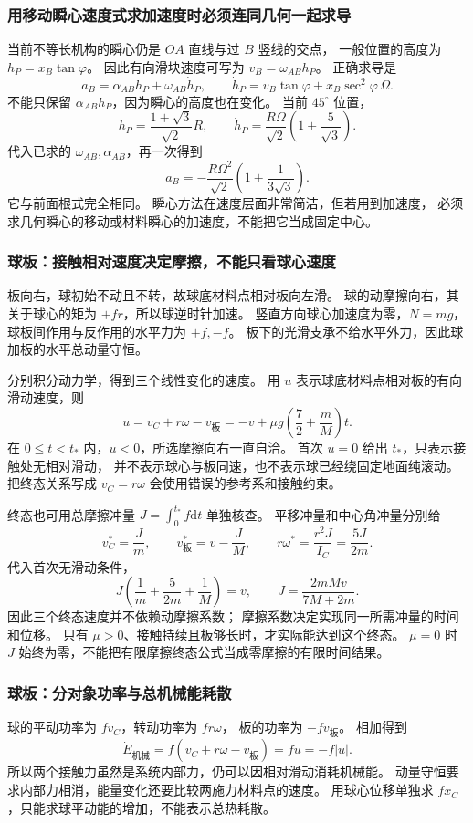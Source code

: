 \documentclass[UTF8,zihao=-4,fontset=fandol,a4paper]{ctexart}
\newcommand{\dd}{\mathrm d}
\begin{document}
\subsubsection*{用移动瞬心速度式求加速度时必须连同几何一起求导}
当前不等长机构的瞬心仍是 $OA$ 直线与过 $B$ 竖线的交点，
一般位置的高度为 $h_P=x_B\tan\varphi$。
因此有向滑块速度可写为 $v_B=\omega_{AB}h_P$。
正确求导是
\[
a_B=\alpha_{AB}h_P+\omega_{AB}\dot h_P,
\qquad
\dot h_P=v_B\tan\varphi+x_B\sec^2\varphi\,\Omega.
\]
不能只保留 $\alpha_{AB}h_P$，因为瞬心的高度也在变化。
当前 $45^\circ$ 位置，
\[
h_P=\frac{1+\sqrt3}{\sqrt2}R,
\qquad
\dot h_P=\frac{R\Omega}{\sqrt2}\left(1+\frac5{\sqrt3}\right).
\]
代入已求的 $\omega_{AB},\alpha_{AB}$，再一次得到
\[
a_B=-\frac{R\Omega^2}{\sqrt2}\left(1+\frac1{3\sqrt3}\right).
\]
它与前面根式完全相同。
瞬心方法在速度层面非常简洁，但若用到加速度，
必须求几何瞬心的移动或材料瞬心的加速度，不能把它当成固定中心。

\subsubsection*{球板：接触相对速度决定摩擦，不能只看球心速度}
板向右，球初始不动且不转，故球底材料点相对板向左滑。
球的动摩擦向右，其关于球心的矩为 $+fr$，所以球逆时针加速。
竖直方向球心加速度为零，$N=mg$，球板间作用与反作用的水平力为 $+f,-f$。
板下的光滑支承不给水平外力，因此球加板的水平总动量守恒。

分别积分动力学，得到三个线性变化的速度。
用 $u$ 表示球底材料点相对板的有向滑动速度，则
\[
u=v_C+r\omega-v_{\text{板}}
=-v+\mu g\left(\frac72+\frac mM\right)t.
\]
在 $0\le t<t_*$ 内，$u<0$，所选摩擦向右一直自洽。
首次 $u=0$ 给出 $t_*$，只表示接触处无相对滑动，
并不表示球心与板同速，也不表示球已经绕固定地面纯滚动。
把终态关系写成 $v_C=r\omega$ 会使用错误的参考系和接触约束。

终态也可用总摩擦冲量 $J=\int_0^{t_*}f\dd t$ 单独核查。
平移冲量和中心角冲量分别给
\[
v_C^*=\frac Jm,\qquad
v_{\text{板}}^*=v-\frac JM,\qquad
r\omega^*=\frac{r^2J}{I_C}=\frac{5J}{2m}.
\]
代入首次无滑动条件，
\[
J\left(\frac1m+\frac{5}{2m}+\frac1M\right)=v,
\qquad J=\frac{2mMv}{7M+2m}.
\]
因此三个终态速度并不依赖动摩擦系数；
摩擦系数决定实现同一所需冲量的时间和位移。
只有 $\mu>0$、接触持续且板够长时，才实际能达到这个终态。
$\mu=0$ 时 $J$ 始终为零，不能把有限摩擦终态公式当成零摩擦的有限时间结果。

\subsubsection*{球板：分对象功率与总机械能耗散}
球的平动功率为 $fv_C$，转动功率为 $fr\omega$，
板的功率为 $-fv_{\text{板}}$。
相加得到
\[
\dot E_{\text{机械}}=f(v_C+r\omega-v_{\text{板}})=fu=-f|u|.
\]
所以两个接触力虽然是系统内部力，仍可以因相对滑动消耗机械能。
动量守恒要求内部力相消，能量变化还要比较两施力材料点的速度。
用球心位移单独求 $fx_C$，只能求球平动能的增加，不能表示总热耗散。
\end{document}
